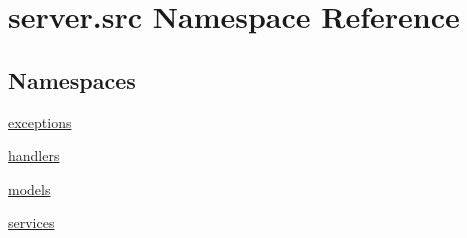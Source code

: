 \hypertarget{namespaceserver_1_1src}{}\section{server.\+src Namespace Reference}
\label{namespaceserver_1_1src}
\subsection*{Namespaces}
\begin{DoxyCompactItemize}
\item 
 \hyperlink{namespaceserver_1_1src_1_1exceptions}{exceptions}
\item 
 \hyperlink{namespaceserver_1_1src_1_1handlers}{handlers}
\item 
 \hyperlink{namespaceserver_1_1src_1_1models}{models}
\item 
 \hyperlink{namespaceserver_1_1src_1_1services}{services}
\end{DoxyCompactItemize}
